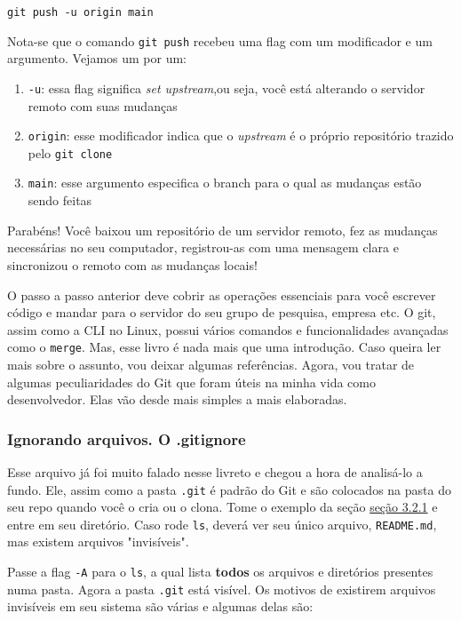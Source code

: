 \documentclass{article}
\begin{document}
  \vspace{1ex}
  \texttt{git push -u origin main}
  \vspace{1ex}

  Nota-se que o comando \texttt{git push} recebeu uma flag com um modificador e um argumento. Vejamos um por um: 

  \begin{enumerate}
	\item{\texttt{-u}: essa flag significa \textit{set upstream},ou seja, você está alterando o servidor remoto com suas mudanças}
	\item{\texttt{origin}: esse modificador indica que o \textit{upstream} é o próprio repositório trazido pelo \texttt{git clone}}
	\item{\texttt{main}: esse argumento especifica o branch para o qual as mudanças estão sendo feitas}
  \end{enumerate}

  Parabéns! Você baixou um repositório de um servidor remoto, fez as mudanças necessárias no seu computador, registrou-as com uma
  mensagem clara e sincronizou o remoto com as mudanças locais!  


  O passo a passo anterior deve cobrir as operações essenciais para você escrever código e mandar para o servidor do seu grupo 
  de pesquisa, empresa etc. O git, assim como a CLI no Linux, possui vários comandos e funcionalidades avançadas como o \texttt{merge}.
  Mas, esse livro é nada mais que uma introdução. Caso queira ler mais sobre o assunto, vou deixar algumas referências. 
  Agora, vou tratar de algumas peculiaridades do Git que foram úteis na minha vida como desenvolvedor. Elas vão desde mais simples a 
  mais elaboradas. 

  \subsubsection{Ignorando arquivos. O .gitignore}

  Esse arquivo já foi muito falado nesse livreto e chegou a hora de analisá-lo a fundo. Ele, assim como a pasta \texttt{.git} 
  é padrão do Git e são colocados na pasta do seu repo quando você o cria ou o clona. Tome o exemplo da 
  seção \href{sec:clone}{seção 3.2.1} e entre em seu diretório. Caso rode \texttt{ls}, deverá ver seu único arquivo, 
  \texttt{README.md}, mas existem arquivos "invisíveis". 
  
  Passe a flag \texttt{-A} para o \texttt{ls}, a qual lista \textbf{todos} os arquivos e diretórios presentes numa pasta. 
  Agora a pasta \texttt{.git} está visível. Os motivos de existirem arquivos invisíveis em seu sistema são várias e algumas delas são:
  
\end{document}
